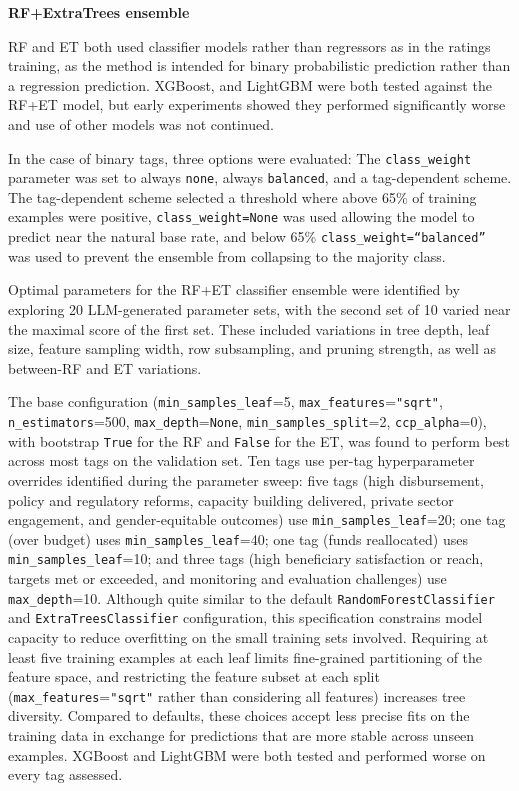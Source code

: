 \textbf{RF+ExtraTrees ensemble}

RF and ET both used classifier models rather than regressors as in the ratings training, as the method is intended for binary probabilistic prediction rather than a regression prediction. XGBoost, and LightGBM were both tested against the RF+ET model, but early experiments showed they performed significantly worse and use of other models was not continued.

In the case of binary tags, three options were evaluated: The \texttt{class\_weight} parameter was set to always \texttt{none}, always \texttt{balanced}, and a tag-dependent scheme. The tag-dependent scheme selected a threshold where above 65\% of training examples were positive, \texttt{class\_weight=None} was used allowing the model to predict near the natural base rate, and below 65\% \texttt{class\_weight=``balanced''} was used to prevent the ensemble from collapsing to the majority class.

Optimal parameters for the RF+ET classifier ensemble were identified by exploring 20 LLM-generated parameter sets, with the second set of 10 varied near the maximal score of the first set. These included variations in tree depth, leaf size, feature sampling width, row subsampling, and pruning strength, as well as between-RF and ET variations.

The base configuration (\texttt{min\_samples\_leaf}=5, \texttt{max\_features}=\texttt{"sqrt"}, \texttt{n\_estimators}=500, \texttt{max\_depth}=\texttt{None}, \texttt{min\_samples\_split}=2, \texttt{ccp\_alpha}=0), with bootstrap \texttt{True} for the RF and \texttt{False} for the ET, was found to perform best across most tags on the validation set. Ten tags use per-tag hyperparameter overrides identified during the parameter sweep: five tags (high disbursement, policy and regulatory reforms, capacity building delivered, private sector engagement, and gender-equitable outcomes) use \texttt{min\_samples\_leaf}=20; one tag (over budget) uses \texttt{min\_samples\_leaf}=40; one tag (funds reallocated) uses \texttt{min\_samples\_leaf}=10; and three tags (high beneficiary satisfaction or reach, targets met or exceeded, and monitoring and evaluation challenges) use \texttt{max\_depth}=10. Although quite similar to the default \texttt{RandomForestClassifier} and \texttt{ExtraTreesClassifier} configuration, this specification constrains model capacity to reduce overfitting on the small training sets involved. Requiring at least five training examples at each leaf limits fine-grained partitioning of the feature space, and restricting the feature subset at each split (\texttt{max\_features}=\texttt{"sqrt"} rather than considering all features) increases tree diversity. Compared to defaults, these choices accept less precise fits on the training data in exchange for predictions that are more stable across unseen examples. XGBoost and LightGBM were both tested and performed worse on every tag assessed.


